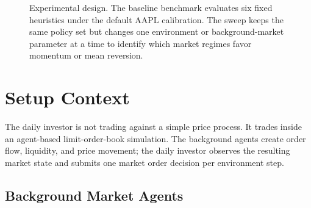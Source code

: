 \documentclass[11pt]{article}
\begin{document}
\begin{figure}[H]
{%
}
\caption{Experimental design. The baseline benchmark evaluates six fixed
heuristics under the default AAPL calibration. The sweep keeps the same policy
set but changes one environment or background-market parameter at a time to
identify which market regimes favor momentum or mean reversion.}
\label{fig:experiment-design}
\end{figure}

\section{Setup Context}

The daily investor is not trading against a simple price process. It trades
inside an agent-based limit-order-book simulation. The background agents create
order flow, liquidity, and price movement; the daily investor observes the
resulting market state and submits one market order decision per environment
step.

\subsection{Background Market Agents}
\end{document}
